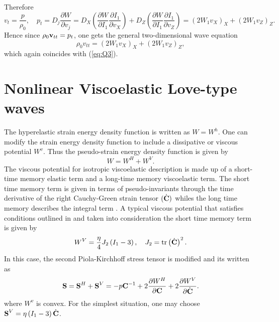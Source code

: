 \documentclass[11pt,letter,subeqn,fleqn]{article}
\numberwithin{equation}{section}
\numberwithin{table}{section}
\numberwithin{figure}{section}
\def\vec#1{{\boldsymbol{\rm #1}}} %
\def\vec#1{{\boldsymbol{\rm #1}}} %
\begin{document}
	Therefore
	\begin{equation}\label{15}
	{v}_{t}=\frac{{p}}{\rho_{0}},\quad {p}_{t}=D_{j}\frac{\partial W}{\partial {v_{j}}}=D_{X}\left(\frac{\partial W}{\partial {I_{1}}}\frac{\partial I_{1}}{\partial {v_{X}}}\right)+D_{Z}\left(\frac{\partial W}{\partial {I_{1}}}\frac{\partial I_{1}}{\partial {v_{Z}}}\right)=\left(2W_{1}v_{X}\right)_{X}+\left(2W_{1}v_{Z}\right)_{Z}.
	\end{equation}
	Hence since $\rho_{0}\vec{v}_{tt}={p_{t}}$, one gets the general two-dimensional wave equation
	\begin{equation}\label{c16}
	\rho_{0}{v}_{tt}=\left(2W_{1}v_{X}\right)_{X}+\left(2W_{1}v_{Z}\right)_{Z},
	\end{equation}
which again coincides with (\ref{eq:Q3}).


\section{Nonlinear Viscoelastic Love-type waves}\label{sec:4:NonlinearViscoelasticLW}
The hyperelastic strain energy density function is written as $W=W^{h}$. One can modify the strain energy density function to include a dissipative or viscous potential $W^{v}$. Thus the pseudo-strain energy density function is given by
\begin{equation}\label{1}
W=W^{H}+W^{V}.
\end{equation}
The viscous potential for isotropic viscoelastic description is made up of a short-time memory elastic term and a long-time memory viscoelastic term. The short time memory term is given in terms of pseudo-invariants through the time derivative of the right Cauchy-Green strain tensor $(\dot{\vec{C}})$ whiles the long time memory describes the integral term \cite{pioletti2000non}. A typical viscous potential that satisfies conditions outlined in \cite{pioletti2000non} and taken into consideration the short time memory term is given by
\begin{equation}\label{2}
W^{V}=\frac{\eta}{4}J_{2}\left(I_{1}-3\right), \quad J_{2}=\mathrm{tr}\left(\dot{\vec{C}}\right)^{2}.
\end{equation}
In this case, the second Piola-Kirchhoff stress tensor is modified and its written as
\begin{equation}\label{3}
\vec{S}=\vec{S}^{H}+\vec{S}^{V}=-p\vec{C}^{-1}+2\frac{\partial W^{H}}{\partial \vec{C}}+2\frac{\partial W^{V}}{\partial \dot{\vec{C}}}.
\end{equation}	
where $W^{v}$ is convex. For the simplest situation, one may choose $\vec{S}^{V}=\eta\left(I_{1}-3\right)\dot{\vec{C}}$.
\end{document}

